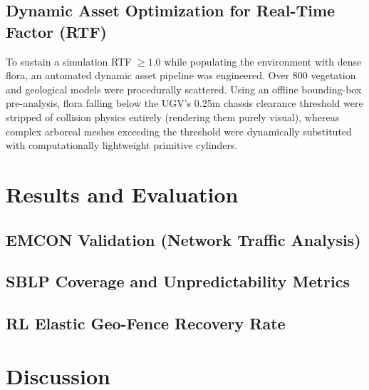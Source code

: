 \documentclass[conference]{IEEEtran}
\begin{document}
\subsection{Dynamic Asset Optimization for Real-Time Factor (RTF)}
To sustain a simulation RTF $\ge 1.0$ while populating the environment with dense flora, an automated dynamic asset pipeline was engineered. Over 800 vegetation and geological models were procedurally scattered. Using an offline bounding-box pre-analysis, flora falling below the UGV's 0.25m chassis clearance threshold were stripped of collision physics entirely (rendering them purely visual), whereas complex arboreal meshes exceeding the threshold were dynamically substituted with computationally lightweight primitive cylinders.

\section{Results and Evaluation}

\subsection{EMCON Validation (Network Traffic Analysis)}

\subsection{SBLP Coverage and Unpredictability Metrics}

\subsection{RL Elastic Geo-Fence Recovery Rate}

\section{Discussion}

\end{document}
